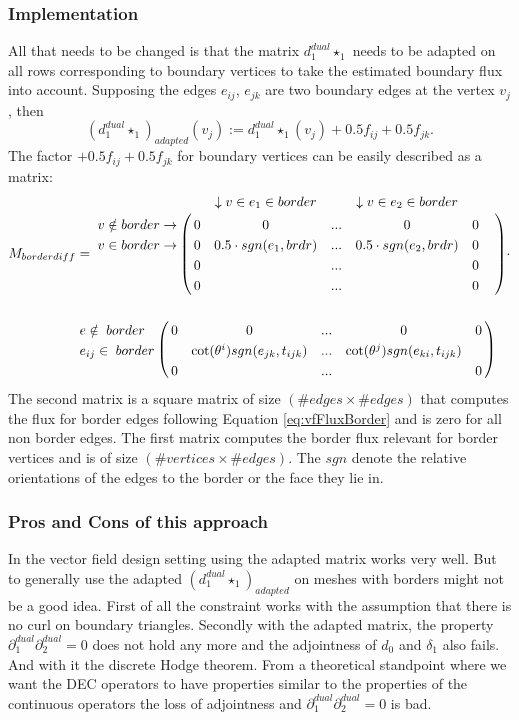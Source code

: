 \subsubsection{Implementation}
All that needs to be changed is that the matrix $d_1^{dual} \star_1$ needs to be adapted on all rows corresponding to boundary vertices to take the estimated boundary flux into account. Supposing the edges $e_{ij}$, $e_{jk}$ are two boundary edges at the vertex $v_j$, then
\[(d_1^{dual} \star_1)_{adapted} (v_j) := d_1^{dual} \star_1(v_j) + 0.5 f_{ij} + 0.5 f_{jk}.\]
The factor $+ 0.5 f_{ij} + 0.5 f_{jk}$ for boundary vertices can be easily described as a matrix:
\begin{align*}M_{borderdiff}& = \bordermatrix{ 
& & \downarrow v \in e_1 \in border & &\downarrow v\in e_{2} \in border& & \cr
v \notin border \rightarrow & 0 & 0& ...& 0& 0 \cr
v\in border \rightarrow & 0 & 0.5 \cdot sgn(e_{1}, brdr) & ... & 0.5 \cdot sgn(e_{2}, brdr)&0\cr
& 0 & & ...& & 0 \cr
& 0 & & ...& & 0
} \cdot \nonumber \\
& \bordermatrix{ 
& & & & &\cr
e \notin \; border & 0 & 0 & ...&0 & 0 \cr
e_{ij} \in\;border& & \cot(\theta^i)sgn(e_{jk}, t_{ijk}) & ... & \cot(\theta^j)sgn(e_{ki}, t_{ijk}) & \cr
& 0 & & ...& & 0
}\end{align*}
The second matrix is a square matrix of size $(\# edges \times \# edges)$ that computes the flux for border edges following Equation \ref{eq:vfFluxBorder} and is zero for all non border edges. The first matrix computes the border flux relevant for border vertices and is of size $(\#vertices \times \#edges)$. The $sgn$ denote the relative orientations of the edges to the border or the face they lie in.


\subsubsection{ Pros and Cons of this approach} In the vector field design setting using the adapted matrix works very well. But to generally use the adapted $(d_1^{dual} \star_1)_{adapted}$ on meshes with borders might not be a good idea. First of all the constraint works with the assumption that there is no curl on boundary triangles. Secondly  with the adapted matrix, the property $\partial^{dual}_1\partial^{dual}_2 = 0$ does not hold any more and the adjointness of $d_0$ and $\delta_1$ also fails. And with it the discrete Hodge theorem. 
From a theoretical standpoint where we want the DEC operators to have properties similar to the properties of the continuous operators the loss of adjointness and $\partial^{dual}_1\partial^{dual}_2 = 0$ is bad. 

